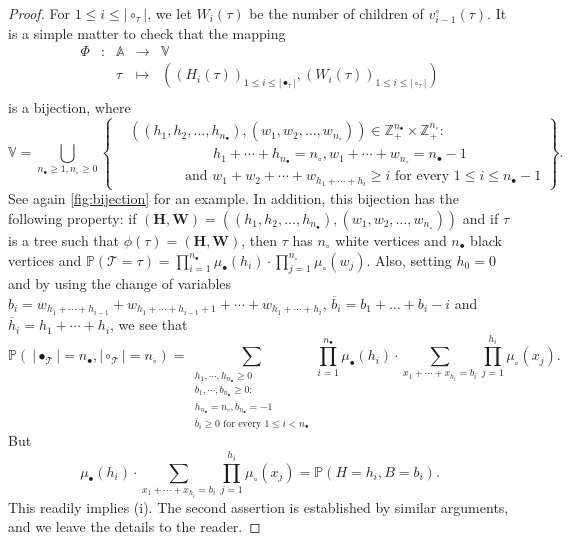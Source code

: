 \documentclass[AHL,XML,longabstracts,Unicode]{cedram}
\providecommand{\abs}[1]{\lvert#1\rvert}
\newcommand{\Z}{\mathbb{Z}}
\def\nc{n_{\circ}}
\def\nb{n_{\bullet}}
\def\Ts{\mathscr{T}}
\renewcommand\Pr[1]{\mathbb{P}\left(#1\right)}
\begin{document}
\begin{proof}
For $1 \leq i \leq \abs{\circ_{\tau}}$, we let $W_{i}(\tau)$ be the number of children of $v^{\circ}_{i-1}(\tau)$.
It is a simple matter to check that the mapping
\[\begin{array}{ccccc}
\Phi& : & \mathbb{A} & \longrightarrow & \mathbb{V} \\
 & & \tau & \longmapsto &  \left(  (H_{i}(\tau))_{1 \leq i \leq \abs{\bullet_{\tau}}} ,   (W_{i}(\tau))_{1 \leq i \leq \abs{\circ_{\tau}}} \right) \\
\end{array}\]
is a bijection, where
\begin{equation*}
\! \!\mathbb{V}= \bigcup_{\nb \geq 1, \nc \geq 0} \left\{ \begin{split} &
  \left(  (h_{1},h_{2}, \ldots,h_{\nb}), (w_{1}, w_{2}, \ldots, w_{\nc}) \right) \in \Z_{+}^{\nb} \times \Z_{+}^{\nc} :  \\
  &  \qquad\qquad\qquad h_{1}+ \cdots+h_{\nb}=\nc, w_{1}+ \cdots+w_{\nc}=\nb-1 \\
     & \qquad\qquad \textrm{and } w_{1}+ w_{2}+ \cdots+w_{h_{1}+ \cdots+h_{i}} \geq i \textrm{ for every } 1 \leq i \leq \nb-1 \end{split}\right\}.
\end{equation*}
See again \cref{fig:bijection} for an example.
In addition, this bijection has the following property: if $(\bm{H},\bm{W})= \left(  (h_{1},h_{2}, \ldots,h_{\nb}), (w_{1}, w_{2}, \ldots, w_{\nc}) \right)$ and if $\tau$ is a tree such that $\phi(\tau)=(\bm{H},\bm{W})$, then $\tau$ has $\nc$ white vertices and $\nb$ black vertices and $\Pr{ \Ts=\tau}= \prod_{i=1} ^{\nb} \mu_{\bullet}(h_{i}) \cdot \prod_{j=1}^{\nc}\mu_{\circ}(w_{j})$.
Also, setting $h_{0}=0$ and by using the change of variables $b_{i}=w_{h_{1}+ \cdots+h_{i-1}}+ w_{h_{1}+ \cdots+h_{i-1}+1}+ \cdots+w_{h_{1}+ \cdots+h_{i}}$, $\overline{b}_{i}= b_1+\dots+b_i-i$ and $\overline{h}_{i}=h_{1}+ \cdots+h_{i}$, we see that
\[
\Pr{\ \abs{\bullet_{\Ts}} =\nb,\abs{\circ_{\Ts}}=\nc}= \sum_{\substack{ h_{1}, \cdots, h_{\nb} \geq 0\\ b_{1}, \cdots, b_{\nb} \geq 0 :  \\ \overline{h}_{\nb}=\nc, \overline{b}_{\nb}=-1 \\ \overline{b}_{i} \geq 0 \textrm{ for every } 1 \leq i  < \nb}}  \prod_{i=1} ^{\nb} \mu_{\bullet}(h_{i}) \cdot \sum_{x_{1}+\cdots+x_{h_{i}}= b_{i}} \prod_{j=1}^{h_{i}}\mu_{\circ}(x_{j}).
\]
But \[ \mu_{\bullet}(h_{i}) \cdot \sum_{x_{1}+\cdots+x_{h_{i}}= b_{i}} \prod_{j=1}^{h_{i}}\mu_{\circ}(x_{j})= \Pr{H=h_{i},B=b_{i}}.\]
This readily implies (i). The second assertion is established by similar arguments, and we leave the details to the reader.
\end{proof}
\end{document}
